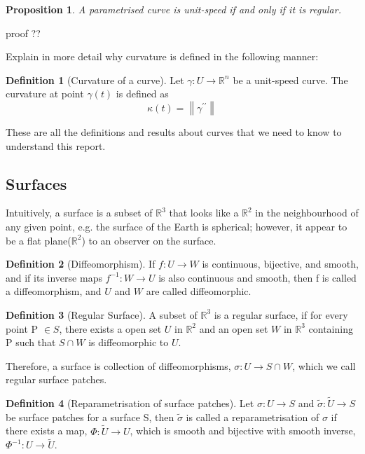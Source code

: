 \documentclass{article}
\theoremstyle{plain}
\newtheorem{proposition}{Proposition}
\theoremstyle{definition}
\newtheorem{definition}{Definition}
\theoremstyle{remark}
\newcommand{\R}{\mathbb{R}}
\begin{document}
\begin{proposition}
    A parametrised curve is unit-speed if and only if it is regular.
\end{proposition}
{\color{red} proof ??}

{\color{red} Explain in more detail why curvature is defined in the following manner: }
\begin{definition}[Curvature of a curve] \label{definition: Curvature of a curve}
    Let \( \gamma: U \rightarrow \R^n \) be a unit-speed curve. The curvature at point \( \gamma(t) \) is defined as \[ \kappa(t) = \left\lVert \gamma^{\prime\prime} \right\rVert  \]
\end{definition}

These are all the definitions and results about curves that we need to know to understand this report.
\subsection{Surfaces}
Intuitively, a surface is a subset of \( \R^3 \) that looks like a \( \R^2 \)  in the neighbourhood of any given point, e.g. the surface of the Earth is spherical; however, it appear to be a flat plane(\( \R^2 \)) to an observer on the surface.

\begin{definition}[Diffeomorphism]
    If \( f: U \rightarrow W \) is continuous, bijective, and smooth, and if its inverse maps \( f^{-1}: W \rightarrow U\) is also continuous and smooth, then f is called a diffeomorphism, and \(U\) and \(W\) are called diffeomorphic.
\end{definition}

\begin{definition}[Regular Surface]
    A subset of \( \R^3 \) is a regular surface, if for every point P \( \in S \), there exists a open set \( U \text{ in } \R^2\) and an open set \( W \text{ in } \R^3\) containing P such that \( S \cap W\) is diffeomorphic to \(U\).
\end{definition}
Therefore, a surface is collection of diffeomorphisms, \( \sigma: U \rightarrow S \cap W \), which we call regular surface patches.

\begin{definition}[Reparametrisation of surface patches]
    Let \( \sigma: U \rightarrow S\) and \( \tilde{\sigma}: \tilde{U} \rightarrow S\) be surface patches for a surface S, then \( \tilde{\sigma} \) is called a reparametrisation of \( \sigma \) if there exists a map, \( \Phi: \tilde{U} \rightarrow U \), which is smooth and bijective with smooth inverse, \( \Phi^{-1}: U \rightarrow \tilde{U} \).
\end{definition}
\end{document}
